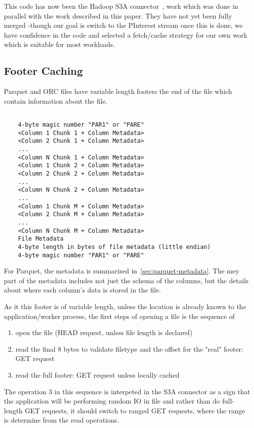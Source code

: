 \documentclass[manuscript]{acmart}
\begin{document}
This code has now been the Hadoop S3A connector\ \cite{HADOOP-18028},
work which was done in parallel with the work described in this paper.
They have not yet been fully merged -though our goal is switch to the
PInterest stream once this is done, we have confidence in the code
and selected a fetch/cache strategy for our own work which is suitable
for most workloads.

\subsection{Footer Caching}\label{subsec:footer-caching}

Parquet and ORC files have variable length footers the end of the file which contain
information about the file.

\begin{verbatim}

    4-byte magic number "PAR1" or "PARE"
    <Column 1 Chunk 1 + Column Metadata>
    <Column 2 Chunk 1 + Column Metadata>
    ...
    <Column N Chunk 1 + Column Metadata>
    <Column 1 Chunk 2 + Column Metadata>
    <Column 2 Chunk 2 + Column Metadata>
    ...
    <Column N Chunk 2 + Column Metadata>
    ...
    <Column 1 Chunk M + Column Metadata>
    <Column 2 Chunk M + Column Metadata>
    ...
    <Column N Chunk M + Column Metadata>
    File Metadata
    4-byte length in bytes of file metadata (little endian)
    4-byte magic number "PAR1" or "PARE"
\end{verbatim}

For Parquet, the metadata is summarized in~\ref{sec:parquet-metadata}.
The mey part of the metadata includes not just the schema of
the columns, but the details about where each column's data is stored
in the file.

As it this footer is of variable length, unless the location is already known
to the application/worker process, the first steps of opening a file
is the sequence of

\begin{enumerate}
  \item{open the file (HEAD request, unless file length is declared)}
  \item{read the final 8 bytes to validate filetype and the offset for the "real" footer: GET request}
  \item{read the full footer: GET request unless locally cached}
\end{enumerate}

The operation 3 in this sequence is interpeted in the S3A connector as a sign
that the application will be performing random IO in file and rather than do full-length GET requests,
it should switch to ranged GET requests, where the range is determine from the read operations.
\end{document}
